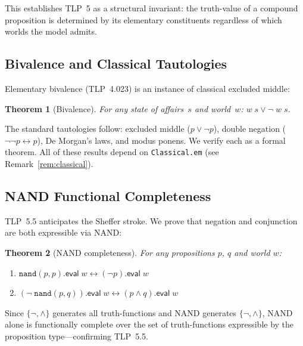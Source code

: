 \documentclass[jsl,bibother]{asl}
\newtheorem{theorem}{Theorem}[section]
\theoremstyle{definition}
\theoremstyle{remark}
\newcommand{\eval}{\mathsf{eval}}
\begin{document}
\noindent
This establishes TLP~5 as a structural invariant: the
truth-value of a compound proposition is determined by its
elementary constituents regardless of which worlds the model
admits.

\subsection{Bivalence and Classical Tautologies}
\label{sec:bivalence}

Elementary bivalence (TLP~4.023) is an instance of classical
excluded middle:

\begin{theorem}[Bivalence]
For any state of affairs~$s$ and world~$w$: $w\;s \lor \lnot\;w\;s$.
\end{theorem}

\noindent
The standard tautologies follow: excluded middle ($p \lor
\lnot p$), double negation ($\lnot\lnot p \leftrightarrow p$),
De Morgan's laws, and modus ponens.  We verify each as a formal
theorem.  All of these results depend on \texttt{Classical.em}
(see Remark~\ref{rem:classical}).

\subsection{NAND Functional Completeness}
\label{sec:nand}

TLP~5.5 anticipates the Sheffer stroke.  We prove that negation
and conjunction are both expressible via NAND:

\begin{theorem}[NAND completeness]
\label{thm:nand}
For any propositions $p$, $q$ and world $w$:
\begin{enumerate}[nosep]
  \item $\mathtt{nand}(p, p).\eval\;w \leftrightarrow
    (\lnot p).\eval\;w$
  \item $(\lnot\;\mathtt{nand}(p, q)).\eval\;w \leftrightarrow
    (p \land q).\eval\;w$
\end{enumerate}
\end{theorem}

\noindent
Since $\{\lnot, \land\}$ generates all truth-functions and NAND
generates $\{\lnot, \land\}$, NAND alone is functionally
complete over the set of truth-functions expressible by the
proposition type---confirming TLP~5.5.
\end{document}
